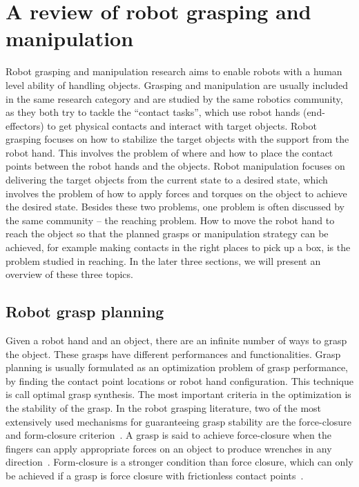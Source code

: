 \section{A review of robot grasping and manipulation}
\label{cha2:sec1}

Robot grasping and manipulation research aims to enable robots with a human level ability of handling objects. Grasping and manipulation are usually included in the same research category and are studied by the same robotics community, as they both try to tackle the ``contact tasks'', which  use robot hands (end-effectors) to get physical contacts and interact with target objects.
Robot grasping focuses on how to stabilize the target objects with the support from the robot hand. This involves the problem of where and how to place the contact points between the robot hands and the objects. Robot manipulation focuses on delivering the target objects from the current state to a desired state, which involves the problem of how to apply forces and torques on the object to achieve the desired state. Besides these two problems, one problem is often discussed by the same community -- the reaching problem. How to move the robot hand to reach the object so that the planned grasps or manipulation strategy can be achieved, for example making contacts in the right places to pick up a box, is the problem studied in reaching. In the later three sections, we will present an overview of these three topics.

\subsection{Robot grasp planning}
\label{cha2:sec1:planning}

Given a robot hand and an object, there are an infinite number of ways to grasp the object. These grasps have different performances and functionalities. Grasp planning is usually formulated as an optimization problem of grasp performance, by finding the contact point locations or robot hand configuration. This technique is call optimal grasp synthesis. The most important criteria in the optimization is the stability of the grasp. In the robot grasping literature, two of the most extensively used mechanisms for guaranteeing grasp stability are the force-closure and form-closure criterion~\citep{Nguyen87}. A grasp is said to achieve force-closure when the fingers can apply appropriate forces on an object to produce wrenches in any direction~\citep{SalisburyJr1985}. Form-closure is a stronger condition than force closure, which can only be achieved if a grasp is force closure with frictionless contact points~\citep{diziouglu1984mechanics}.

